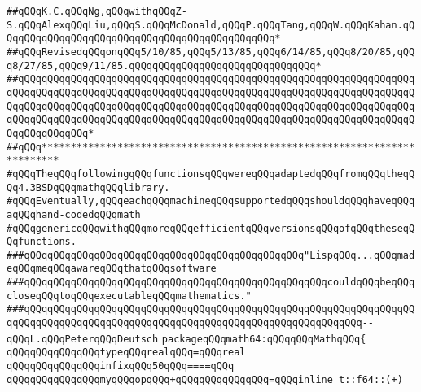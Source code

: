 \verb|##qQQqK.C.qQQqNg,qQQqwithqQQqZ-S.qQQqAlexqQQqLiu,qQQqS.qQQqMcDonald,qQQqP.qQQqTang,qQQqW.qQQqKahan.qQQqqQQqqQQqqQQqqQQqqQQqqQQqqQQqqQQqqQQqqQQqqQQq*|\newline
\verb|##qQQqRevisedqQQqonqQQq5/10/85,qQQq5/13/85,qQQq6/14/85,qQQq8/20/85,qQQq8/27/85,qQQq9/11/85.qQQqqQQqqQQqqQQqqQQqqQQqqQQqqQQq*|\newline
\verb|##qQQqqQQqqQQqqQQqqQQqqQQqqQQqqQQqqQQqqQQqqQQqqQQqqQQqqQQqqQQqqQQqqQQqqQQqqQQqqQQqqQQqqQQqqQQqqQQqqQQqqQQqqQQqqQQqqQQqqQQqqQQqqQQqqQQqqQQqqQQqqQQqqQQqqQQqqQQqqQQqqQQqqQQqqQQqqQQqqQQqqQQqqQQqqQQqqQQqqQQqqQQqqQQqqQQqqQQqqQQqqQQqqQQqqQQqqQQqqQQqqQQqqQQqqQQqqQQqqQQqqQQqqQQqqQQqqQQqqQQqqQQqqQQqqQQq*|\newline
\verb|##qQQq*************************************************************************|\newline
\newline
\verb|#qQQqTheqQQqfollowingqQQqfunctionsqQQqwereqQQqadaptedqQQqfromqQQqtheqQQq4.3BSDqQQqmathqQQqlibrary.|\newline
\verb|#qQQqEventually,qQQqeachqQQqmachineqQQqsupportedqQQqshouldqQQqhaveqQQqaqQQqhand-codedqQQqmath|\newline
\verb|#qQQqgenericqQQqwithqQQqmoreqQQqefficientqQQqversionsqQQqofqQQqtheseqQQqfunctions.|\newline
\newline
\newline
\newline
\verb|###qQQqqQQqqQQqqQQqqQQqqQQqqQQqqQQqqQQqqQQqqQQqqQQq"LispqQQq...qQQqmadeqQQqmeqQQqawareqQQqthatqQQqsoftware|\newline
\verb|###qQQqqQQqqQQqqQQqqQQqqQQqqQQqqQQqqQQqqQQqqQQqqQQqqQQqcouldqQQqbeqQQqcloseqQQqtoqQQqexecutableqQQqmathematics."|\newline
\verb|###qQQqqQQqqQQqqQQqqQQqqQQqqQQqqQQqqQQqqQQqqQQqqQQqqQQqqQQqqQQqqQQqqQQqqQQqqQQqqQQqqQQqqQQqqQQqqQQqqQQqqQQqqQQqqQQqqQQqqQQqqQQqqQQq--qQQqL.qQQqPeterqQQqDeutsch|\newline
\newline
\newline
\verb|packageqQQqmath64:qQQqqQQqMathqQQq{|\newline
\newline
\verb|qQQqqQQqqQQqqQQqtypeqQQqrealqQQq=qQQqreal|\newline
\newline
\verb|qQQqqQQqqQQqqQQqinfixqQQq50qQQq====qQQq|\newline
\newline
\verb|qQQqqQQqqQQqqQQqmyqQQqopqQQq+qQQqqQQqqQQqqQQq=qQQqinline_t::f64::(+)|\newline
